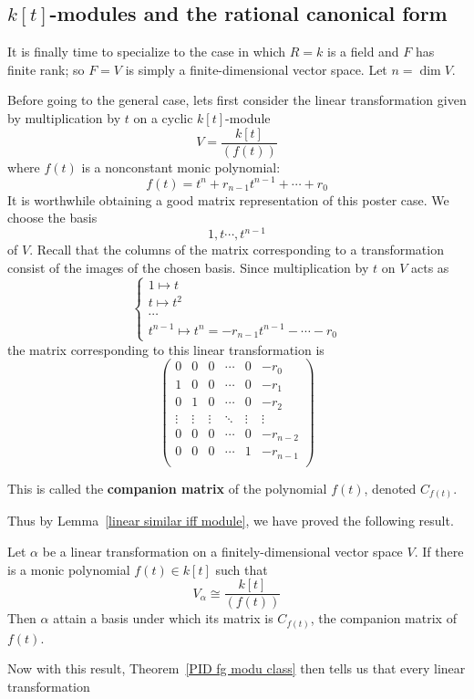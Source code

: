 \subsection{$k[t]$-modules and the rational canonical form}
It is finally time to specialize to the case in which $R=k$ is a field and $F$ has finite rank; so $F=V$ is simply a finite-dimensional vector space. Let $n=\dim V$.\par
Before going to the general case, lets first consider the linear transformation given by multiplication by $t$ on a cyclic $k[t]$-module
\[V=\dfrac{k[t]}{(f(t))}\]
where $f(t)$ is a nonconstant monic polynomial:
\[f(t)=t^n+r_{n-1}t^{n-1}+\cdots+r_0\]
It is worthwhile obtaining a good matrix representation of this poster case. We choose the basis
\[1,t\cdots,t^{n-1}\]
of $V$. Recall that the columns of the matrix corresponding to a transformation consist of the images of the chosen basis. Since multiplication by $t$ on $V$ acts as
\[\left\{\begin{array}{l}
1\mapsto t\\
t\mapsto t^2\\
\cdots\\
t^{n-1}\mapsto t^n=-r_{n-1}t^{n-1}-\cdots-r_0
\end{array}\right. \]
the matrix corresponding to this linear transformation is
\[\begin{pmatrix}
0&0&0&\cdots&0&-r_0\\
1&0&0&\cdots&0&-r_1\\
0&1&0&\cdots&0&-r_2\\
\vdots&\vdots&\vdots&\ddots&\vdots&\vdots\\
0&0&0&\cdots&0&-r_{n-2}\\
0&0&0&\cdots&1&-r_{n-1}\\
\end{pmatrix}\]
\begin{definition}
This is called the \textbf{companion matrix} of the polynomial $f(t)$, denoted $C_{f(t)}$.
\end{definition}
Thus by Lemma~\ref{linear similar iff module}, we have proved the following result.
\begin{proposition}
Let $\alpha$ be a linear transformation on a finitely-dimensional vector space $V$. If there is a monic polynomial $f(t)\in k[t]$ such that
\[V_\alpha\cong\frac{k[t]}{(f(t))}\]
Then $\alpha$ attain a basis under which its matrix is $C_{f(t)}$, the companion matrix of $f(t)$.
\end{proposition}
Now with this result, Theorem~\ref{PID fg modu class} then tells us that every linear transformation
